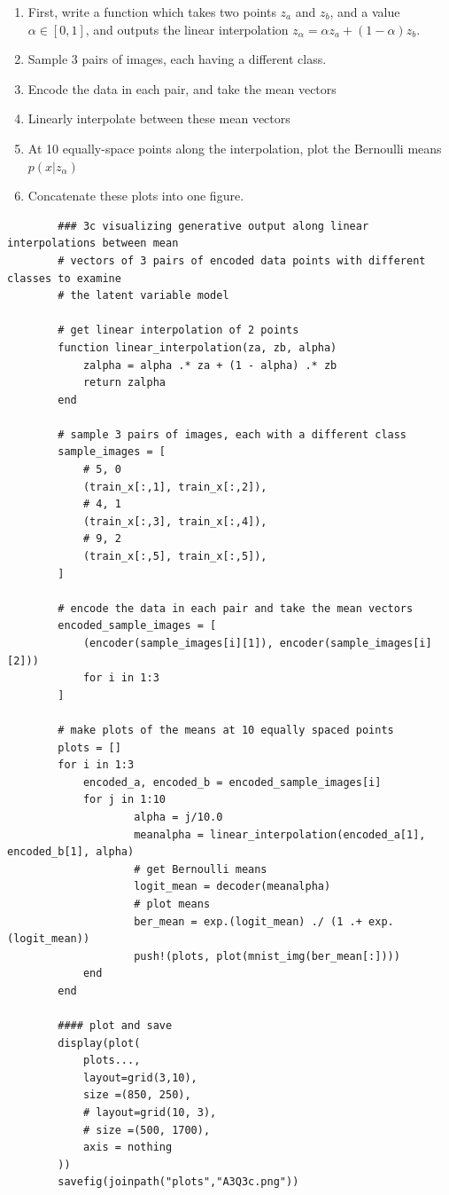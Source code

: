 \documentclass{article}
\begin{document}
\begin{enumerate}[label=(\alph*)]
	\begin{enumerate}[label=(\alph*)]
		\item First, write a function which takes two points $z_a$ and $z_b$, and a value $\alpha \in [0,1]$, and outputs the linear interpolation $z_\alpha = \alpha z_a + (1 - \alpha) z_b$.
		\item Sample 3 pairs of images, each having a different class.
		\item Encode the data in each pair, and take the mean vectors
		\item Linearly interpolate between these mean vectors
		\item At 10 equally-space points along the interpolation, plot the Bernoulli means $p(x|z_\alpha)$
		\item Concatenate these plots into one figure.
	\end{enumerate}

	\begin{lstlisting}
		### 3c visualizing generative output along linear interpolations between mean
		# vectors of 3 pairs of encoded data points with different classes to examine 
		# the latent variable model

		# get linear interpolation of 2 points
		function linear_interpolation(za, zb, alpha)
			zalpha = alpha .* za + (1 - alpha) .* zb
			return zalpha
		end 

		# sample 3 pairs of images, each with a different class
		sample_images = [
			# 5, 0
			(train_x[:,1], train_x[:,2]),
			# 4, 1
			(train_x[:,3], train_x[:,4]),
			# 9, 2
			(train_x[:,5], train_x[:,5]),
		]

		# encode the data in each pair and take the mean vectors
		encoded_sample_images = [
			(encoder(sample_images[i][1]), encoder(sample_images[i][2])) 
			for i in 1:3
		]

		# make plots of the means at 10 equally spaced points
		plots = []
		for i in 1:3
			encoded_a, encoded_b = encoded_sample_images[i]
			for j in 1:10
					alpha = j/10.0
					meanalpha = linear_interpolation(encoded_a[1], encoded_b[1], alpha)
					# get Bernoulli means
					logit_mean = decoder(meanalpha)
					# plot means
					ber_mean = exp.(logit_mean) ./ (1 .+ exp.(logit_mean))
					push!(plots, plot(mnist_img(ber_mean[:])))
			end
		end

		#### plot and save
		display(plot(
			plots..., 
			layout=grid(3,10), 
			size =(850, 250),
			# layout=grid(10, 3), 
			# size =(500, 1700),
			axis = nothing
		))
		savefig(joinpath("plots","A3Q3c.png"))
	\end{lstlisting}


\end{enumerate}
\end{document}
